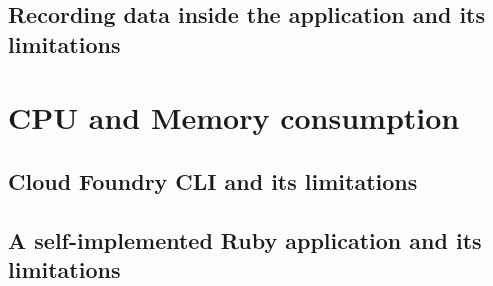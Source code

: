   \subsection{Recording data inside the application and its limitations}
\section{CPU and Memory consumption}
\subsection{Cloud Foundry CLI and its limitations}
\subsection{A self-implemented  Ruby application and its limitations}


